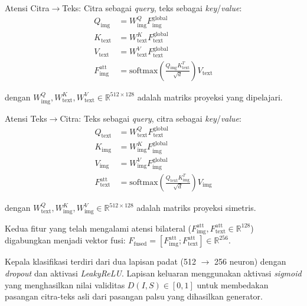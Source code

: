 \documentclass[12pt,a4paper]{article}
\begin{document}
Atensi Citra$\rightarrow$Teks: Citra sebagai \textit{query}, teks sebagai \textit{key}/\textit{value}:
\begin{align}
  Q_{\text{img}}              & = W_{\text{img}}^Q F_{\text{img}}^{\text{global}} \nonumber                                                    \\
  K_{\text{text}}             & = W_{\text{text}}^K F_{\text{text}}^{\text{global}} \nonumber                                                  \\
  V_{\text{text}}             & = W_{\text{text}}^V F_{\text{text}}^{\text{global}} \label{eq:IV.8}                                            \\
  F_{\text{img}}^{\text{att}} & = \text{softmax}\left(\frac{Q_{\text{img}} K_{\text{text}}^T}{\sqrt{d}}\right) V_{\text{text}} \label{eq:IV.9}
\end{align}

\noindent dengan $W_{\text{img}}^Q, W_{\text{text}}^K, W_{\text{text}}^V \in \mathbb{R}^{512 \times 128}$ adalah matriks proyeksi yang dipelajari.

Atensi Teks$\rightarrow$Citra: Teks sebagai \textit{query}, citra sebagai \textit{key}/\textit{value}:
\begin{align}
  Q_{\text{text}}              & = W_{\text{text}}^Q F_{\text{text}}^{\text{global}} \nonumber                                                  \\
  K_{\text{img}}               & = W_{\text{img}}^K F_{\text{img}}^{\text{global}} \nonumber                                                    \\
  V_{\text{img}}               & = W_{\text{img}}^V F_{\text{img}}^{\text{global}} \label{eq:IV.10}                                             \\
  F_{\text{text}}^{\text{att}} & = \text{softmax}\left(\frac{Q_{\text{text}} K_{\text{img}}^T}{\sqrt{d}}\right) V_{\text{img}} \label{eq:IV.11}
\end{align}

\noindent dengan $W_{\text{text}}^Q, W_{\text{img}}^K, W_{\text{img}}^V \in \mathbb{R}^{512 \times 128}$ adalah matriks proyeksi simetris.

Kedua fitur yang telah mengalami atensi bilateral ($F_{\text{img}}^{\text{att}}, F_{\text{text}}^{\text{att}} \in \mathbb{R}^{128}$) digabungkan menjadi vektor fusi: $F_{\text{fused}} = [F_{\text{img}}^{\text{att}}; F_{\text{text}}^{\text{att}}] \in \mathbb{R}^{256}$. 

Kepala klasifikasi terdiri dari dua lapisan padat (512 $\rightarrow$ 256 neuron) dengan \textit{dropout} dan aktivasi \textit{LeakyReLU}. Lapisan keluaran menggunakan aktivasi \textit{sigmoid} yang menghasilkan nilai validitas $D(I, S) \in [0, 1]$ untuk membedakan pasangan citra-teks asli dari pasangan palsu yang dihasilkan generator.
\end{document}

